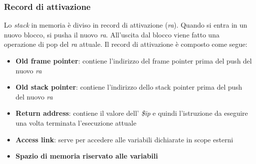 \documentclass[../../main]{subfiles}
\begin{document}
\subsubsection{Record di attivazione}
Lo \emph{stack} in memoria è diviso in record di attivazione (\emph{ra}). Quando si entra in un nuovo blocco, si pusha il nuovo \emph{ra}. All'uscita dal blocco viene fatto una operazione di pop del \emph{ra} attuale.
Il record di attivazione è composto come segue: 
\begin{itemize}
    \item \textbf{Old frame pointer}: contiene l'indirizzo del frame pointer prima del push del nuovo \emph{ra}
    \item \textbf{Old stack pointer}: contiene l'indirizzo dello stack pointer prima del push del nuovo \emph{ra}
    \item \textbf{Return address}: contiene il valore dell' \emph{\$ip} e quindi l'istruzione da eseguire una volta terminata l'esecuzione attuale
    \item \textbf{Access link}: serve per accedere alle variabili dichiarate in scope esterni
    \item \textbf{Spazio di memoria riservato alle variabili}
\end{itemize}
\end{document}
